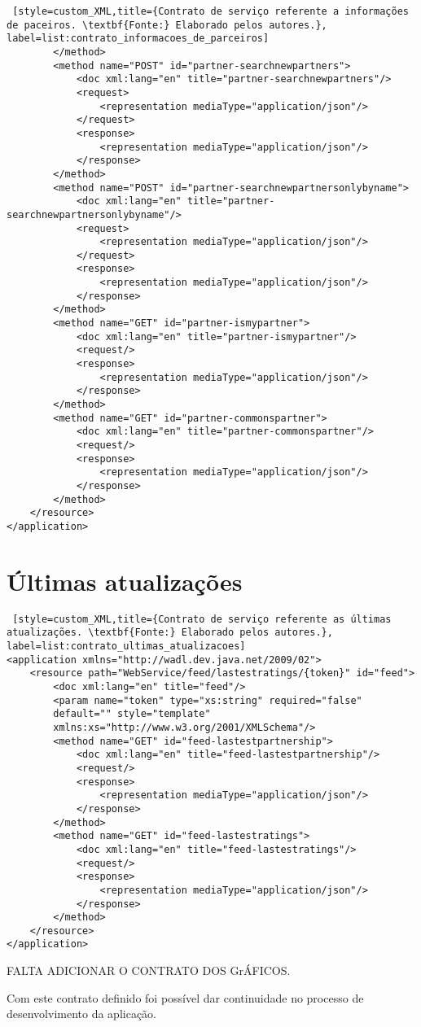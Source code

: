 \begin{lstlisting} [style=custom_XML,title={Contrato de serviço referente a informações de paceiros. \textbf{Fonte:} Elaborado pelos autores.}, label=list:contrato_informacoes_de_parceiros]
		</method>
		<method name="POST" id="partner-searchnewpartners">
			<doc xml:lang="en" title="partner-searchnewpartners"/>
			<request>
				<representation mediaType="application/json"/>
			</request>
			<response>
				<representation mediaType="application/json"/>
			</response>
		</method>
		<method name="POST" id="partner-searchnewpartnersonlybyname">
			<doc xml:lang="en" title="partner-searchnewpartnersonlybyname"/>
			<request>
				<representation mediaType="application/json"/>
			</request>
			<response>
				<representation mediaType="application/json"/>
			</response>
		</method>
		<method name="GET" id="partner-ismypartner">
			<doc xml:lang="en" title="partner-ismypartner"/>
			<request/>
			<response>
				<representation mediaType="application/json"/>
			</response>
		</method>
		<method name="GET" id="partner-commonspartner">
			<doc xml:lang="en" title="partner-commonspartner"/>
			<request/>
			<response>
				<representation mediaType="application/json"/>
			</response>
		</method>
	</resource>
</application>
\end{lstlisting}


\section*{Últimas atualizações}

\begin{lstlisting} [style=custom_XML,title={Contrato de serviço referente as últimas atualizações. \textbf{Fonte:} Elaborado pelos autores.}, label=list:contrato_ultimas_atualizacoes] 	
<application xmlns="http://wadl.dev.java.net/2009/02">
	<resource path="WebService/feed/lastestratings/{token}" id="feed">
		<doc xml:lang="en" title="feed"/>
		<param name="token" type="xs:string" required="false" 
		default="" style="template" 
		xmlns:xs="http://www.w3.org/2001/XMLSchema"/>
		<method name="GET" id="feed-lastestpartnership">
			<doc xml:lang="en" title="feed-lastestpartnership"/>
			<request/>
			<response>
				<representation mediaType="application/json"/>
			</response>
		</method>
		<method name="GET" id="feed-lastestratings">
			<doc xml:lang="en" title="feed-lastestratings"/>
			<request/>
			<response>
				<representation mediaType="application/json"/>
			</response>
		</method>
	</resource>
</application>
\end{lstlisting}

FALTA ADICIONAR O CONTRATO DOS GrÁFICOS.

Com este contrato definido foi possível dar continuidade no processo de desenvolvimento da aplicação.